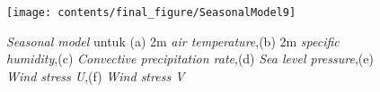 \begin{figure}[H]
	\centering
	\texttt{[image: contents/final\_figure/SeasonalModel9]}
	\caption{\textit{Seasonal model} untuk (a) 2m \textit{air temperature},(b) 2m \textit{specific humidity},(c) \textit{Convective precipitation rate},(d) \textit{Sea level pressure},(e) \textit{Wind stress U},(f) \textit{Wind stress V}}
	\label{fig:SM9}
\end{figure}